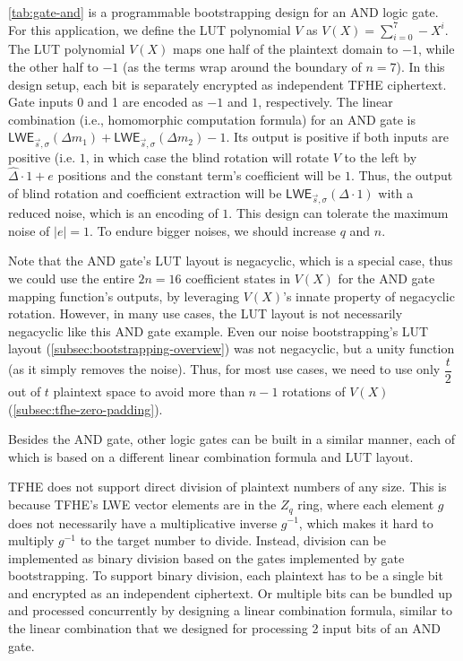 \autoref{tab:gate-and} is a programmable bootstrapping design for an AND logic gate. For this application, we define the LUT polynomial $V$ as $V(X) = \sum\limits_{i=0}^{7}-X^i$. The LUT polynomial $V(X)$ maps one half of the plaintext domain to $-1$, while the other half to $-1$ (as the terms wrap around the boundary of $n=7$). In this design setup, each bit is separately encrypted as independent TFHE ciphertext. Gate inputs 0 and 1 are encoded as $-1$ and $1$, respectively. The linear combination (i.e., homomorphic computation formula) for an AND gate is $\textsf{LWE}_{\vec{s}, \sigma}(\Delta m_1) + \textsf{LWE}_{\vec{s}, \sigma}(\Delta m_2) - 1$. Its output is positive if both inputs are positive (i.e. $1$, in which case the blind rotation will rotate $V$ to the left by $\hat\Delta\cdot 1 + e$ positions and the constant term's coefficient will be $1$. Thus, the output of blind rotation and coefficient extraction will be $\textsf{LWE}_{\vec{s}, \sigma}(\Delta \cdot 1)$ with a reduced noise, which is an encoding of $1$. This design can tolerate the maximum noise of $|e| = 1$. To endure bigger noises, we should increase $q$ and $n$. 

Note that the AND gate's LUT layout is negacyclic, which is a special case, thus we could use the entire $2n=16$ coefficient states in $V(X)$ for the AND gate mapping function's outputs, by leveraging $V(X)$'s innate property of negacyclic rotation. However, in many use cases, the LUT layout is not necessarily negacyclic like this AND gate example. Even our noise bootstrapping's LUT layout (\autoref{subsec:bootstrapping-overview}) was not negacyclic, but a unity function (as it simply removes the noise). Thus, for most use cases, we need to use only $\dfrac{t}{2}$ out of $t$ plaintext space to avoid more than $n-1$ rotations of $V(X)$ (\autoref{subsec:tfhe-zero-padding}). 

Besides the AND gate, other logic gates can be built in a similar manner, each of which is based on a different linear combination formula and LUT layout. 

 TFHE does not support direct division of plaintext numbers of any size. This is because TFHE's LWE vector elements are in the $Z_q$ ring, where each element $g$ does not necessarily have a multiplicative inverse $g^{-1}$, which makes it hard to multiply $g^{-1}$ to the target number to divide. Instead, division can be implemented as binary division based on the gates implemented by gate bootstrapping. To support binary division, each plaintext has to be a single bit and encrypted as an independent ciphertext. Or multiple bits can be bundled up and processed concurrently by designing a linear combination formula, similar to the linear combination that we designed for processing 2 input bits of an AND gate.

